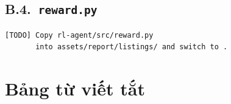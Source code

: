 \begin{appendices}
\section*{B.4.\ \texttt{reward.py}}
% 
\begin{lstlisting}[style=pythonstyle, caption={Placeholder for reward.py.}]
[TODO] Copy rl-agent/src/reward.py
       into assets/report/listings/ and switch to .
\end{lstlisting}

\chapter{Bảng từ viết tắt}
\label{app:acronyms}


\end{appendices}

